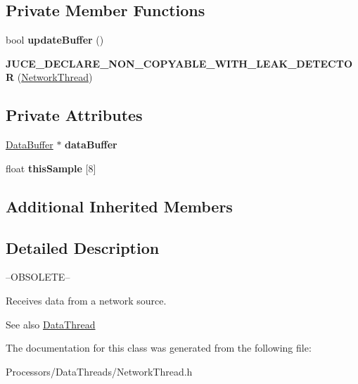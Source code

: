 \subsection*{Private Member Functions}
\begin{DoxyCompactItemize}
\item 
\hypertarget{classNetworkThread_a7413a18632ce0007e8b11d8d3faf445f}{bool {\bfseries update\-Buffer} ()}\label{classNetworkThread_a7413a18632ce0007e8b11d8d3faf445f}

\item 
\hypertarget{classNetworkThread_af8c35b4c7a7aa9fb8ac251c94489a882}{{\bfseries J\-U\-C\-E\-\_\-\-D\-E\-C\-L\-A\-R\-E\-\_\-\-N\-O\-N\-\_\-\-C\-O\-P\-Y\-A\-B\-L\-E\-\_\-\-W\-I\-T\-H\-\_\-\-L\-E\-A\-K\-\_\-\-D\-E\-T\-E\-C\-T\-O\-R} (\hyperlink{classNetworkThread}{Network\-Thread})}\label{classNetworkThread_af8c35b4c7a7aa9fb8ac251c94489a882}

\end{DoxyCompactItemize}
\subsection*{Private Attributes}
\begin{DoxyCompactItemize}
\item 
\hypertarget{classNetworkThread_a17f457977b6956ed9580cb81047fb7f5}{\hyperlink{classDataBuffer}{Data\-Buffer} $\ast$ {\bfseries data\-Buffer}}\label{classNetworkThread_a17f457977b6956ed9580cb81047fb7f5}

\item 
\hypertarget{classNetworkThread_afd577cd700a51958297d02bb5fda9c9f}{float {\bfseries this\-Sample} \mbox{[}8\mbox{]}}\label{classNetworkThread_afd577cd700a51958297d02bb5fda9c9f}

\end{DoxyCompactItemize}
\subsection*{Additional Inherited Members}


\subsection{Detailed Description}
--O\-B\-S\-O\-L\-E\-T\-E--

Receives data from a network source.

\begin{DoxySeeAlso}{See also}
\hyperlink{classDataThread}{Data\-Thread} 
\end{DoxySeeAlso}


The documentation for this class was generated from the following file\-:\begin{DoxyCompactItemize}
\item 
Processors/\-Data\-Threads/Network\-Thread.\-h\end{DoxyCompactItemize}

